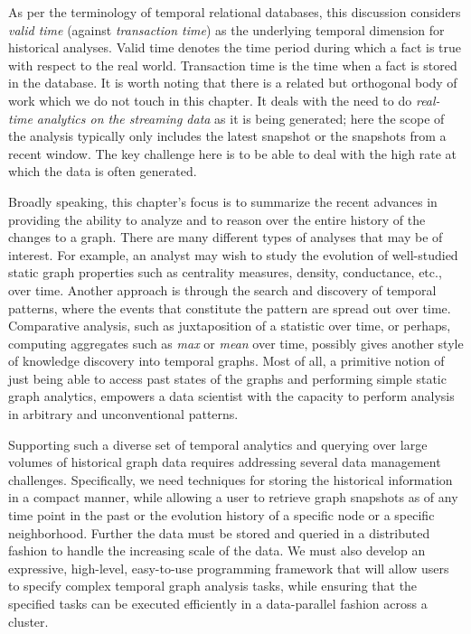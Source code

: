 \documentclass{svjour3}
\begin{document}
As per the terminology of temporal relational databases, this discussion considers {\em valid time} (against {\em transaction time}) as the underlying temporal dimension for historical analyses. Valid time denotes the time
period during which a fact is true with respect to the real world. Transaction time is the time
when a fact is stored in the database. 
It is worth noting that there is a related but orthogonal body of work which we do not touch in this chapter. It deals with the need to do {\em real-time analytics on the streaming data} as it is being generated; here the scope of the analysis typically only includes the latest snapshot or the snapshots from a recent window. The key challenge here is to be able to deal with the high rate at which the data is often generated.


Broadly speaking, this chapter's focus is to summarize the recent advances in providing the ability to analyze and to reason over the entire history of 
the changes to a graph. There are many different types of analyses that may be of interest. 
For example, an analyst may wish to study the evolution of well-studied static graph properties such
as centrality measures, density, conductance, etc., over time. Another approach is through the search and 
discovery of temporal patterns, where the events that constitute the pattern are spread out over time. 
Comparative analysis, such as juxtaposition of a statistic over time, or perhaps, computing 
aggregates such as \textit{max} or \textit{mean} over time, possibly gives another style of knowledge discovery 
into temporal graphs. Most of all, a primitive notion of just being able to access past states of the graphs 
and performing simple static graph analytics, empowers a data scientist with the capacity to 
perform analysis in arbitrary and unconventional patterns.

Supporting such a diverse set of temporal analytics and querying over large volumes of historical graph data 
requires addressing several data management challenges. Specifically, we need techniques for storing
the historical information in a compact manner, while allowing a user to retrieve graph snapshots as of any
time point in the past or the evolution history of a specific node or a specific neighborhood. Further the
data must be stored and queried in a distributed fashion to handle the increasing scale of the data.
We must also develop an expressive, high-level, easy-to-use programming framework that will allow users to 
specify complex temporal graph analysis tasks, while ensuring that the specified tasks can be executed efficiently 
in a data-parallel fashion across a cluster.
\end{document}
